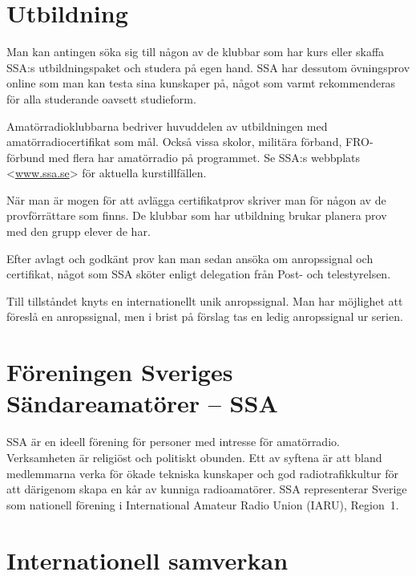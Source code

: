 
\section*{Utbildning}

Man kan antingen söka sig till någon av de klubbar som har kurs eller skaffa
SSA:s utbildningspaket och studera på egen hand.
SSA har dessutom övningsprov online som man kan testa sina kunskaper på, något
som varmt rekommenderas för alla studerande oavsett studieform.

Amatörradioklubbarna bedriver huvuddelen av utbildningen med
amatörradiocertifikat som mål.
Också vissa skolor, militära förband, FRO-förbund med flera har amatörradio på
programmet.
Se SSA:s webbplats <\href{https://www.ssa.se}{www.ssa.se}> för aktuella
kurstillfällen.

När man är mogen för att avlägga certifikatprov skriver man för någon av de
provförrättare som finns.
De klubbar som har utbildning brukar planera prov med den grupp elever de har.

Efter avlagt och godkänt prov kan man sedan ansöka om anropssignal och
certifikat, något som SSA sköter enligt delegation från Post- och telestyrelsen.

Till tillståndet knyts en internationellt unik anropssignal.
Man har möjlighet att föreslå en anropssignal, men i brist på förslag tas en
ledig anropssignal ur serien.

\section*{Föreningen Sveriges Sändareamatörer -- SSA}

SSA är en ideell förening för personer med intresse för amatörradio.
Verksamheten är religiöst och politiskt obunden.
Ett av syftena är att bland medlemmarna verka för ökade tekniska kunskaper och
god radiotrafikkultur för att därigenom skapa en kår av kunniga radioamatörer.
SSA representerar Sverige som nationell förening i
International Amateur Radio Union (IARU), Region~1.

\section*{Internationell samverkan}

